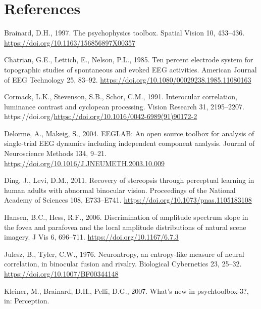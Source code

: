 \documentclass[
  12pt,
]{article}
\newlength{\cslhangindent}
\newenvironment{CSLReferences}[2] %
 {\begin{list}{}{%
  \setlength{\itemindent}{0pt}
  \setlength{\leftmargin}{0pt}
  \setlength{\parsep}{0pt}
  \ifodd #1
   \setlength{\leftmargin}{\cslhangindent}
   \setlength{\itemindent}{-1\cslhangindent}
  \fi
  \setlength{\itemsep}{#2\baselineskip}}}
 {\end{list}}
\begin{document}
\section*{References}\label{references}

\protect{}\label{refs}
\begin{CSLReferences}{1}{0}
Brainard, D.H., 1997. The psychophysics toolbox. Spatial Vision 10,
433--436. \url{https://doi.org/10.1163/156856897X00357}

Chatrian, G.E., Lettich, E., Nelson, P.L., 1985. Ten percent electrode
system for topographic studies of spontaneous and evoked EEG activities.
American Journal of EEG Technology 25, 83--92.
\url{https://doi.org/10.1080/00029238.1985.11080163}

Cormack, L.K., Stevenson, S.B., Schor, C.M., 1991. Interocular
correlation, luminance contrast and cyclopean processing. Vision
Research 31, 2195--2207.
https://doi.org/\url{https://doi.org/10.1016/0042-6989(91)90172-2}

Delorme, A., Makeig, S., 2004. EEGLAB: An open source toolbox for
analysis of single-trial EEG dynamics including independent component
analysis. Journal of Neuroscience Methods 134, 9--21.
\url{https://doi.org/10.1016/J.JNEUMETH.2003.10.009}

Ding, J., Levi, D.M., 2011. Recovery of stereopsis through perceptual
learning in human adults with abnormal binocular vision. Proceedings of
the National Academy of Sciences 108, E733--E741.
\url{https://doi.org/10.1073/pnas.1105183108}

Hansen, B.C., Hess, R.F., 2006. Discrimination of amplitude spectrum
slope in the fovea and parafovea and the local amplitude distributions
of natural scene imagery. J Vis 6, 696--711.
\url{https://doi.org/10.1167/6.7.3}

Julesz, B., Tyler, C.W., 1976. Neurontropy, an entropy-like measure of
neural correlation, in binocular fusion and rivalry. Biological
Cybernetics 23, 25--32. \url{https://doi.org/10.1007/BF00344148}

Kleiner, M., Brainard, D.H., Pelli, D.G., 2007. What's new in
psychtoolbox-3?, in: Perception.


\end{CSLReferences}
\end{document}
